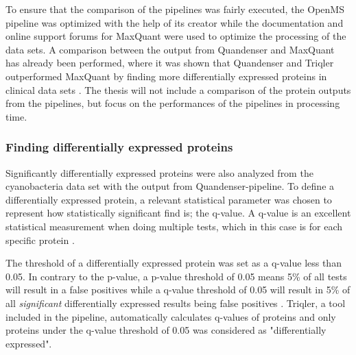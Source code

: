 To ensure that the comparison of the pipelines was fairly executed, the OpenMS pipeline was optimized with the help of its creator while the documentation and online support forums for MaxQuant were used to optimize the processing of the data sets. A comparison between the output from Quandenser and MaxQuant has already been performed, where it was shown that Quandenser and Triqler outperformed MaxQuant by finding more differentially expressed proteins in clinical data sets \cite{quandenser}. The thesis will not include a comparison of the protein outputs from the pipelines, but focus on the performances of the pipelines in processing time.

\subsubsection{Finding differentially expressed proteins}
Significantly differentially expressed proteins were also analyzed from the cyanobacteria data set with the output from Quandenser-pipeline. To define a differentially expressed protein, a relevant statistical parameter was chosen to represent how statistically significant find is; the q-value. A q-value is an excellent statistical measurement when doing multiple tests, which in this case is for each specific protein \cite{q-value}.

The threshold of a differentially expressed protein was set as a q-value less than 0.05. In contrary to the p-value, a p-value threshold of 0.05 means 5\% of all tests will result in a false positives while a q-value threshold of 0.05 will result in 5\% of all \textit{significant} differentially expressed results being false positives \cite{q-value, nonlinear}. Triqler, a tool included in the pipeline, automatically calculates q-values of proteins and only proteins under the q-value threshold of 0.05 was considered as "differentially expressed".
